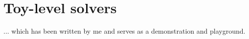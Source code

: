 \section{Toy-level solvers}

... which has been written by me and serves as a demonstration and playground.



